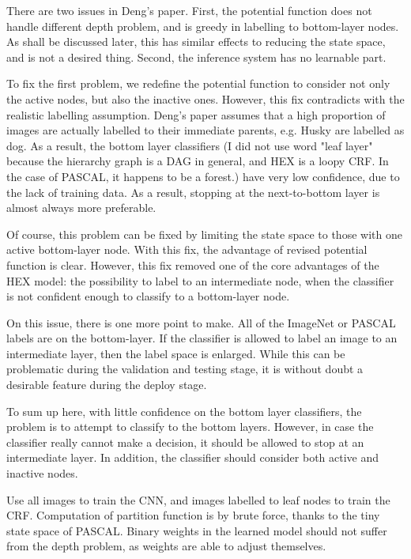 \documentclass[11pt,a4paper]{article}
\begin{document}
There are two issues in Deng's paper. First, the potential function does not handle different depth problem, and is greedy in labelling to bottom-layer nodes. As shall be discussed later, this has similar effects to reducing the state space, and is not a desired thing. Second, the inference system has no learnable part.

To fix the first problem, we redefine the potential function to consider not only the active nodes, but also the inactive ones. However, this fix contradicts with the realistic labelling assumption. Deng's paper assumes that a high proportion of images are actually labelled to their immediate parents, e.g. Husky are labelled as dog. As a result, the bottom layer classifiers (I did not use word "leaf layer" because the hierarchy graph is a DAG in general, and HEX is a loopy CRF. In the case of PASCAL, it happens to be a forest.) have very low confidence, due to the lack of training data. As a result, stopping at the next-to-bottom layer is almost always more preferable.

Of course, this problem can be fixed by limiting the state space to those with one active bottom-layer node. With this fix, the advantage of revised potential function is clear. However, this fix removed one of the core advantages of the HEX model: the possibility to label to an intermediate node, when the classifier is not confident enough to classify to a bottom-layer node.

On this issue, there is one more point to make. All of the ImageNet or PASCAL labels are on the bottom-layer. If the classifier is allowed to label an image to an intermediate layer, then the label space is enlarged. While this can be problematic during the validation and testing stage, it is without doubt a desirable feature during the deploy stage.

To sum up here, with little confidence on the bottom layer classifiers, the problem is to attempt to classify to the bottom layers. However, in case the classifier really cannot make a decision, it should be allowed to stop at an intermediate layer. In addition, the classifier should consider both active and inactive nodes.

Use all images to train the CNN, and images labelled to leaf nodes to train the CRF. Computation of partition function is by brute force, thanks to the tiny state space of PASCAL. Binary weights in the learned model should not suffer from the depth problem, as weights are able to adjust themselves.
\end{document}
